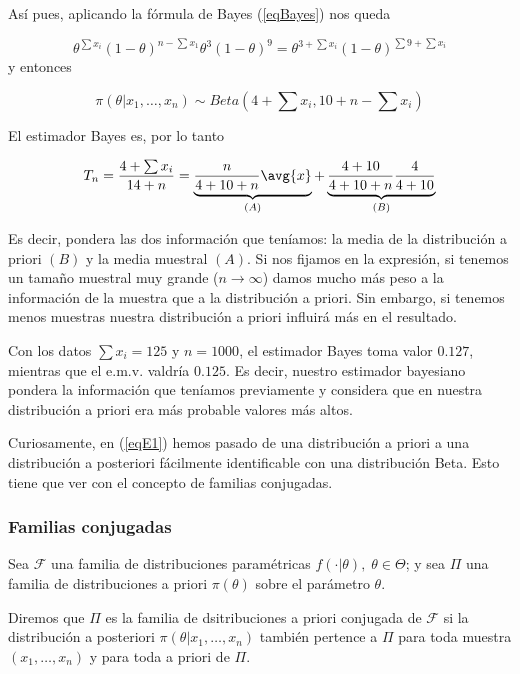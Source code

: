 \documentclass{apuntes}
\begin{document}
Así pues, aplicando la fórmula de Bayes (\ref{eqBayes}) nos queda 

\begin{equation}\label{eqE1}
\theta^{\sum x_i}(1-\theta)^{n-\sum x_1} \theta^3 (1-\theta)^9 = \theta^{3+\sum x_i} (1-\theta)^{\sum 9 + \sum x_i} 
\end{equation} y entonces

\[  \pi(\theta | x_1,\dotsc,x_n)  \sim Beta(4 + \sum x_i, 10 + n - \sum x_i) \]

El estimador Bayes es, por lo tanto

\[ T_n = \frac{4 + \sum x_i}{14 + n} = \underbrace{\frac{n}{4 + 10 + n}\avg{x}}_{(A)} + \underbrace{\frac{4+10}{4+10+n}\frac{4}{4+10}}_{(B)} \]

Es decir, pondera las dos información que teníamos: la media de la distribución a priori $(B)$ y la media muestral $(A)$. Si nos fijamos en la expresión, si tenemos un tamaño muestral muy grande ($n\to\infty$) damos mucho más peso a la información de la muestra que a la distribución a priori. Sin embargo, si tenemos menos muestras nuestra distribución a priori influirá más en el resultado.

Con los datos $\sum x_i = 125$ y $n = 1000$, el estimador Bayes toma valor $0.127$, mientras que el e.m.v. valdría $0.125$. Es decir, nuestro estimador bayesiano pondera la información que teníamos previamente y considera que en nuestra distribución a priori era más probable valores más altos.

Curiosamente, en (\ref{eqE1}) hemos pasado de una distribución a priori a una distribución a posteriori fácilmente identificable con una distribución Beta. Esto tiene que ver con el concepto de familias conjugadas.

\subsubsection{Familias conjugadas}

\begin{defn} Sea $\mathcal{F}$ una familia de distribuciones paramétricas $f(\cdot | \theta),\;\theta\in\Theta$; y sea $\Pi$ una familia de distribuciones a priori $\pi(\theta)$ sobre el parámetro $\theta$. 

Diremos que $\Pi$ es la familia de dsitribuciones a priori conjugada de $\mathcal{F}$ si la distribución a posteriori $ \pi(\theta | x_1,\dotsc,x_n) $ también pertence a $\Pi$ para toda muestra $ ( x_1,\dotsc,x_n) $ y para toda a priori de $\Pi$.
\end{defn}
\end{document}
